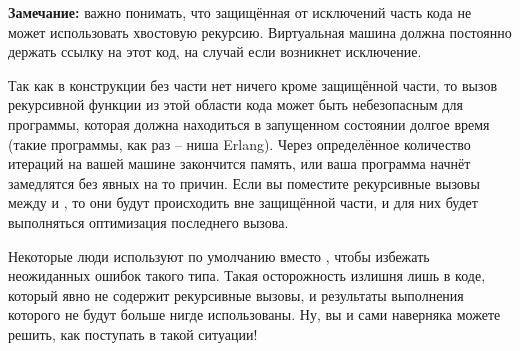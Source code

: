 \colorbox{lgray}
{
\begin{minipage}{1.0\linewidth}
    \textbf{Замечание:} важно понимать, что защищённая от исключений часть кода не может использовать хвостовую рекурсию.
    Виртуальная машина должна постоянно держать ссылку на этот код, на случай если возникнет исключение.

    Так как в конструкции  без части  нет ничего кроме защищённой части, то вызов рекурсивной функции из этой области кода может быть небезопасным для программы, которая должна находиться в запущенном состоянии долгое время (такие программы, как раз \--- ниша Erlang).
    Через определённое количество итераций на вашей машине закончится память, или ваша программа начнёт замедлятся без явных на то причин.
    Если вы поместите рекурсивные вызовы между  и , то они будут происходить вне защищённой части, и для них будет выполняться оптимизация последнего вызова.

    Некоторые люди  используют по умолчанию  вместо , чтобы избежать неожиданных ошибок такого типа.
    Такая осторожность излишня лишь в коде, который явно не содержит рекурсивные вызовы, и результаты выполнения которого не будут больше нигде использованы. Ну, вы и сами наверняка можете решить, как поступать в такой ситуации!
\end{minipage}
}
